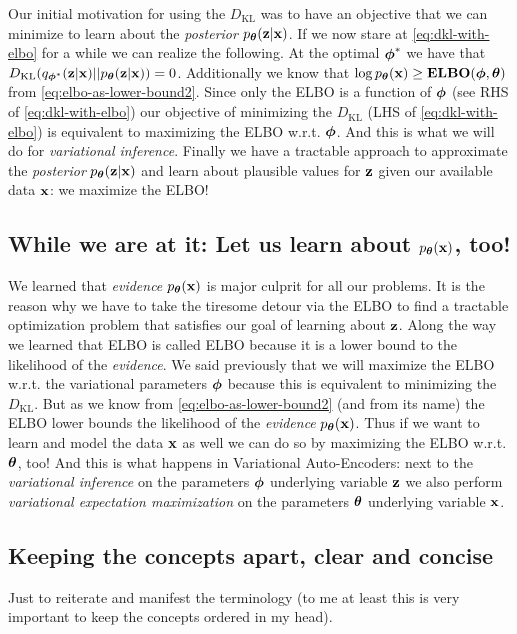 \documentclass[11pt]{article}
\theoremstyle{definition}
\begin{document}
\par 
Our initial motivation for using the $D_\text{KL}$ was to have an objective that we can minimize to learn about the \textit{posterior} $p_{\boldsymbol{\theta}}(\mathbf{z}|\mathbf{x})$. If we now stare at \autoref{eq:dkl-with-elbo} for a while we can realize the following. At the optimal $\boldsymbol{\phi}^*$ we have that $	D_{\text{KL}}(q_{\boldsymbol{\phi}^*}(\mathbf{z}|\mathbf{x})||p_{\boldsymbol{\theta}}(\mathbf{z}|\mathbf{x})) = 0$. Additionally we know that $\log p_{\boldsymbol{\theta}}(\mathbf{x}) \geq \mathbf{ELBO}(\boldsymbol{\phi}, \boldsymbol{\theta})$ from \autoref{eq:elbo-as-lower-bound2}. Since only the ELBO is a function of $\boldsymbol{\phi}$ (see RHS of \autoref{eq:dkl-with-elbo}) our objective of minimizing the $D_{\text{KL}}$ (LHS of \autoref{eq:dkl-with-elbo}) is equivalent to maximizing the ELBO w.r.t. $\boldsymbol{\phi}$. And this is what we will do for \textit{variational inference}. Finally we have a tractable approach to approximate the \textit{posterior} $p_{\boldsymbol{\theta}}(\mathbf{z}|\mathbf{x})$ and learn about plausible values for $\mathbf{z}$ given our available data $\mathbf{x}$: we maximize the ELBO!

\subsection{While we are at it: Let us learn about $p_{\boldsymbol{\theta}}(\mathbf{x})$, too! }
We learned that \textit{evidence}  $p_{\boldsymbol{\theta}}(\mathbf{x})$ is major culprit for all our problems. It is the reason why we have to take the tiresome detour via the ELBO to find a tractable optimization problem that satisfies our goal of learning about $\mathbf{z}$. Along the way we learned that ELBO is called ELBO because it is a lower bound to the likelihood of the \textit{evidence}. We said previously that we will maximize the ELBO w.r.t. the variational parameters $\boldsymbol{\phi}$ because this is equivalent to minimizing the $D_{\text{KL}}$. But as we know from \autoref{eq:elbo-as-lower-bound2} (and from its name) the ELBO lower bounds the likelihood of the \textit{evidence}  $p_{\boldsymbol{\theta}}(\mathbf{x})$. Thus if we want to learn and model the data $\mathbf{x}$ as well we can do so by maximizing the ELBO w.r.t. $\boldsymbol{\theta}$, too! And this is what happens in Variational Auto-Encoders: next to the \textit{variational inference} on the parameters $\boldsymbol{\phi}$ underlying variable $\mathbf{z}$ we also perform \textit{variational expectation maximization} on the parameters $\boldsymbol{\theta}$ underlying variable $\mathbf{x}$.

\subsection{Keeping the concepts apart, clear and concise}
Just to reiterate and manifest the terminology (to me at least this is very important to keep the concepts ordered in my head).
\end{document}
